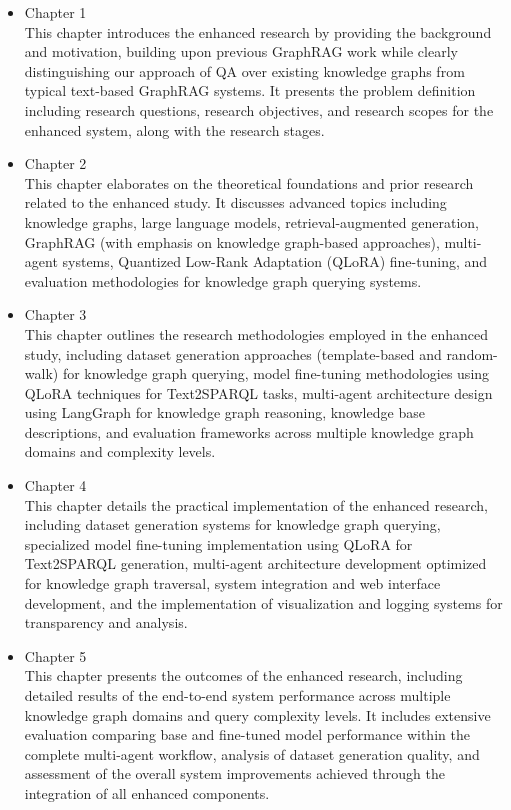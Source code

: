 \begin{itemize}
	\item Chapter 1 \babSatu \\
	    This chapter introduces the enhanced research by providing the background and motivation, building upon previous GraphRAG work while clearly distinguishing our approach of QA over existing knowledge graphs from typical text-based GraphRAG systems. It presents the problem definition including research questions, research objectives, and research scopes for the enhanced system, along with the research stages.
	    
	\item Chapter 2 \babDua \\
	    This chapter elaborates on the theoretical foundations and prior research related to the enhanced study. It discusses advanced topics including knowledge graphs, large language models, retrieval-augmented generation, GraphRAG (with emphasis on knowledge graph-based approaches), multi-agent systems, Quantized Low-Rank Adaptation (QLoRA) fine-tuning, and evaluation methodologies for knowledge graph querying systems.
	    
	\item Chapter 3 \babTiga \\
	    This chapter outlines the research methodologies employed in the enhanced study, including dataset generation approaches (template-based and random-walk) for knowledge graph querying, model fine-tuning methodologies using QLoRA techniques for Text2SPARQL tasks, multi-agent architecture design using LangGraph for knowledge graph reasoning, knowledge base descriptions, and evaluation frameworks across multiple knowledge graph domains and complexity levels.
	    
	\item Chapter 4 \babEmpat \\
		This chapter details the practical implementation of the enhanced research, including dataset generation systems for knowledge graph querying, specialized model fine-tuning implementation using QLoRA for Text2SPARQL generation, multi-agent architecture development optimized for knowledge graph traversal, system integration and web interface development, and the implementation of visualization and logging systems for transparency and analysis.
		
	\item Chapter 5 \babLima \\
	    This chapter presents the outcomes of the enhanced research, including detailed results of the end-to-end system performance across multiple knowledge graph domains and query complexity levels. It includes extensive evaluation comparing base and fine-tuned model performance within the complete multi-agent workflow, analysis of dataset generation quality, and assessment of the overall system improvements achieved through the integration of all enhanced components.
	    

\end{itemize}
